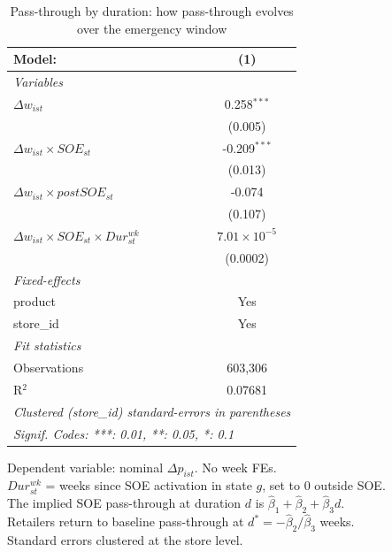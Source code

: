 
\begin{table}[htbp]
   \caption{\label{tab:passthrough_duration} Pass-through by duration: how pass-through evolves over the emergency window}
   \centering
   \begin{tabular}{lc}
      \tabularnewline \midrule \midrule
      Model:                                                   & (1)\\  
      \midrule
      \emph{Variables}\\
      $\Delta w_{ist}$                                         & 0.258$^{***}$\\   
                                                               & (0.005)\\   
      $\Delta w_{ist} \times SOE_{st}$                         & -0.209$^{***}$\\   
                                                               & (0.013)\\   
      $\Delta w_{ist} \times postSOE_{st}$                     & -0.074\\   
                                                               & (0.107)\\   
      $\Delta w_{ist} \times SOE_{st} \times Dur^{wk}_{st}$    & $7.01\times 10^{-5}$\\    
                                                               & (0.0002)\\   
      \midrule
      \emph{Fixed-effects}\\
      product                                                  & Yes\\  
      store\_id                                                & Yes\\  
      \midrule
      \emph{Fit statistics}\\
      Observations                                             & 603,306\\  
      R$^2$                                                    & 0.07681\\  
      \midrule \midrule
      \multicolumn{2}{l}{\emph{Clustered (store\_id) standard-errors in parentheses}}\\
      \multicolumn{2}{l}{\emph{Signif. Codes: ***: 0.01, **: 0.05, *: 0.1}}\\
   \end{tabular}
   
   \par \raggedright 
   Dependent variable: nominal $\Delta p_{ist}$. No week FEs.\\
   $Dur^{wk}_{st}$ = weeks since SOE activation in state $g$, set to 0 outside SOE.\\
   The implied SOE pass-through at duration $d$ is $\hat{\beta}_1 + \hat{\beta}_2 + \hat{\beta}_3 d$.\\
   Retailers return to baseline pass-through at $d^* = -\hat{\beta}_2 / \hat{\beta}_3$ weeks.\\
   Standard errors clustered at the store level.
\end{table}


